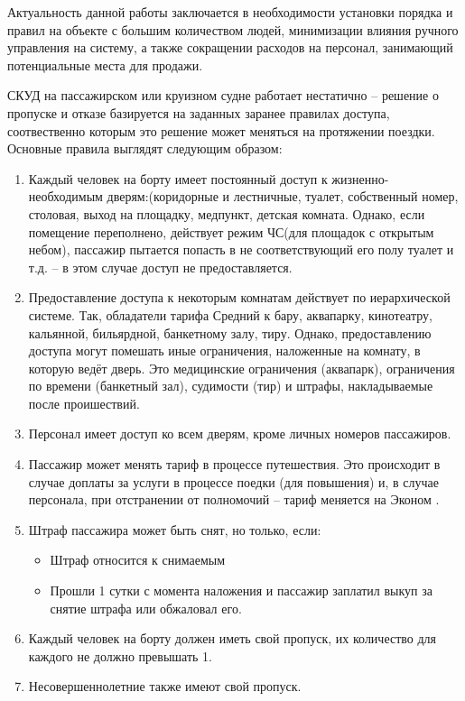 Актуальность данной работы заключается в необходимости установки порядка и правил на объекте с большим количеством людей, минимизации влияния ручного управления на систему, а также сокращении расходов на персонал, занимающий потенциальные места для продажи.

СКУД на пассажирском или круизном судне работает нестатично -- решение о пропуске и отказе базируется на заданных заранее правилах доступа, соотвественно которым это решение может меняться на протяжении поездки. Основные правила выглядят следующим образом:
\begin{enumerate}
	\item Каждый человек на борту имеет постоянный доступ к жизненно-необходимым дверям:(коридорные и лестничные, туалет, собственный номер, столовая, выход на площадку, медпункт, детская комната.
	Однако, если помещение переполнено, действует режим ЧС(для площадок с открытым небом), пассажир пытается попасть в не соответствующий его полу туалет и т.д. -- в этом случае доступ не предоставляется.
	\item Предоставление доступа к некоторым комнатам действует по иерархической системе. Так, обладатели тарифа \textquotedbl Средний \textquotedbl к бару, аквапарку, кинотеатру, кальянной, бильярдной, банкетному залу, тиру.
	Однако, предоставлению доступа могут помешать иные ограничения, наложенные на комнату, в которую ведёт дверь. Это медицинские ограничения (аквапарк), ограничения по времени (банкетный зал), судимости (тир) и штрафы, накладываемые после проишествий.
	\item Персонал имеет доступ ко всем дверям, кроме личных номеров пассажиров.
	\item Пассажир может менять тариф в процессе путешествия. Это происходит в случае доплаты за услуги в процессе поедки (для повышения) и, в случае персонала, при отстранении от полномочий -- тариф меняется на \textquotedbl Эконом \textquotedbl.
	\item Штраф пассажира может быть снят, но только, если:
	\begin{itemize}
		\item Штраф относится к снимаемым
		\item Прошли 1 сутки с момента наложения и пассажир заплатил выкуп за снятие штрафа или обжаловал его.
	\end{itemize}
	\item Каждый человек на борту должен иметь свой пропуск, их количество для каждого не должно превышать 1.
	\item Несовершеннолетние также имеют свой пропуск.

\end{enumerate}
